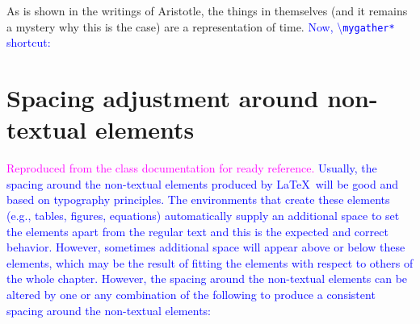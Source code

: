 \documentclass[phd,showgrids]{ndsu-thesis-2022}
\newcommand\italk[1]{\textcolor{blue}{#1}}  %
\newcommand\cmd[1]{\textbackslash\texttt{#1}}  %
\begin{document}
\noindent As is shown in the writings of Aristotle, the things in themselves (and it remains a mystery why this is the case) are a representation of time. \italk{Now, \cmd{mygather*} shortcut:}


\section{Spacing adjustment around non-textual elements}
\textcolor{magenta}{Reproduced from the class documentation	for ready reference.} \italk{Usually, the spacing around the non-textual elements produced by \LaTeX\ will be good and based on typography principles. The environments that create these elements (e.g., tables, figures, equations) automatically supply an additional space to set the elements apart from the regular text and this is the expected and correct behavior. However, sometimes additional space will appear above or below these elements, which may be the result of fitting the elements with respect to others of the whole chapter. However, the spacing around the non-textual elements can be altered by one or any combination of the following to produce a consistent spacing around the non-textual elements:}
\end{document}
